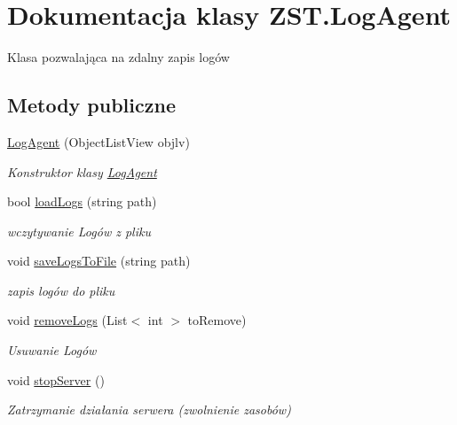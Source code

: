 \hypertarget{class_z_s_t_1_1_log_agent}{}\section{Dokumentacja klasy Z\+S\+T.\+Log\+Agent}
\label{class_z_s_t_1_1_log_agent}


Klasa pozwalająca na zdalny zapis logów  


\subsection*{Metody publiczne}
\begin{DoxyCompactItemize}
\item 
\hyperlink{class_z_s_t_1_1_log_agent_ae8069c077b97c2279e968d9035af26bd}{Log\+Agent} (Object\+List\+View objlv)
\begin{DoxyCompactList}\small\item\em Konstruktor klasy \hyperlink{class_z_s_t_1_1_log_agent}{Log\+Agent} \end{DoxyCompactList}\item 
bool \hyperlink{class_z_s_t_1_1_log_agent_aea2dd7532c7e8ec5a83090e82f0d0dc6}{load\+Logs} (string path)
\begin{DoxyCompactList}\small\item\em wczytywanie Logów z pliku \end{DoxyCompactList}\item 
void \hyperlink{class_z_s_t_1_1_log_agent_a97f26bbd103d88b925de8255744b1d80}{save\+Logs\+To\+File} (string path)
\begin{DoxyCompactList}\small\item\em zapis logów do pliku \end{DoxyCompactList}\item 
void \hyperlink{class_z_s_t_1_1_log_agent_aaeff335322e7f2bce588f1fee8e1f8ab}{remove\+Logs} (List$<$ int $>$ to\+Remove)
\begin{DoxyCompactList}\small\item\em Usuwanie Logów \end{DoxyCompactList}\item 
void \hyperlink{class_z_s_t_1_1_log_agent_a5d2a7cf19d74252ff007a5eef86e0da3}{stop\+Server} ()
\begin{DoxyCompactList}\small\item\em Zatrzymanie działania serwera (zwolnienie zasobów) \end{DoxyCompactList}\end{DoxyCompactItemize}


